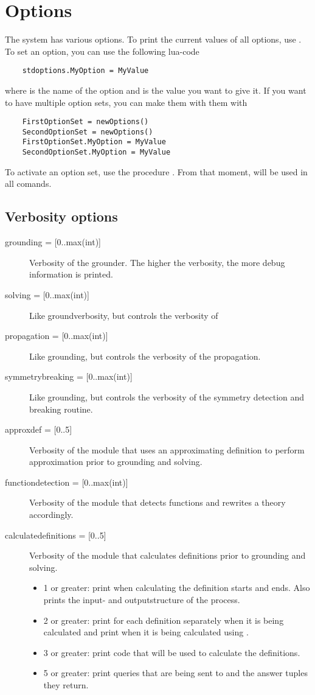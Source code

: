 \section{Options}
The \idp system has various options. To print the current values of all options, use .  To set an option, you can use the following lua-code
\begin{lstlisting}
	stdoptions.MyOption = MyValue
\end{lstlisting}
where  is the name of the option and  is the value you want to give it. If you want to have multiple option sets, you can make them with them with
\begin{lstlisting}
	FirstOptionSet = newOptions()
	SecondOptionSet = newOptions()
	FirstOptionSet.MyOption = MyValue
	SecondOptionSet.MyOption = MyValue
\end{lstlisting}
To activate an option set, use the procedure .  From that moment,  will be used in all comands.

\subsection{Verbosity options}
\begin{description}
	\item[{grounding = [0..max(int)]}] Verbosity of the grounder. The higher the verbosity, the more debug information is printed.
	\item[{solving = [0..max(int)]}] Like groundverbosity, but controls the verbosity of \minisatid
	\item[{propagation = [0..max(int)]}] Like grounding, but controls the verbosity of the propagation.
	\item[{symmetrybreaking = [0..max(int)]}] Like grounding, but controls the verbosity of the symmetry detection and breaking routine.
	\item[{approxdef = [0..5]}] Verbosity of the module that uses an approximating definition to perform approximation prior to grounding and solving.
	\item[{functiondetection = [0..max(int)]}] Verbosity of the module that detects functions and rewrites a theory accordingly. 
	\item[{calculatedefinitions = [0..5]}] Verbosity of the module that calculates definitions prior to grounding and solving. 
		\begin{itemize}
		\item 1 or greater: print when calculating the definition starts and ends. Also prints the input- and outputstructure of the process.
		\item 2 or greater: print for each definition separately when it is being calculated and print when it is being calculated using \xsb.
		\item 3 or greater: print \xsb code that will be used to calculate the definitions.
		\item 5 or greater: print queries that are being sent to \xsb and the answer tuples they return.
		\end{itemize}
\end{description}

